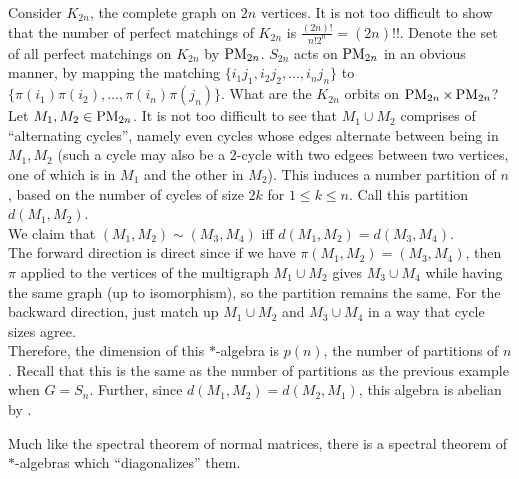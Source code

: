 	\begin{fex}
		Consider $K_{2n}$, the complete graph on $2n$ vertices. It is not too difficult to show that the number of perfect matchings of $K_{2n}$ is $\frac{(2n)!}{n!2^n} = (2n)!!$. Denote the set of all perfect matchings on $K_{2n}$ by $\operatorname{PM}_{2n}$. $S_{2n}$ acts on $\operatorname{PM}_{2n}$ in an obvious manner, by mapping the matching $\{i_1j_1,i_2j_2,\ldots,i_nj_n\}$ to $\{\pi(i_1)\pi(i_2),\ldots,\pi(i_n)\pi(j_n)\}$. What are the $K_{2n}$ orbits on $\operatorname{PM}_{2n} \times \operatorname{PM}_{2n}$?\\
		Let $M_1,M_2 \in \operatorname{PM}_{2n}$. It is not too difficult to see that $M_1 \cup M_2$ comprises of ``alternating cycles'', namely even cycles whose edges alternate between being in $M_1,M_2$ (such a cycle may also be a $2$-cycle with two edgees between two vertices, one of which is in $M_1$ and the other in $M_2$).  This induces a number partition of $n$, based on the number of cycles of size $2k$ for $1 \le k \le n$. Call this partition $d(M_1,M_2)$.\\
		
		We claim that $(M_1,M_2) \sim (M_3,M_4)$ iff $d(M_1,M_2) = d(M_3,M_4)$.\\
		The forward direction is direct since if we have $\pi (M_1,M_2) = (M_3,M_4)$, then $\pi$ applied to the vertices of the multigraph $M_1 \cup M_2$ gives $M_3 \cup M_4$ while having the same graph (up to isomorphism), so the partition remains the same. For the backward direction, just match up $M_1 \cup M_2$ and $M_3 \cup M_4$ in a way that cycle sizes agree.\\

		Therefore, the dimension of this $*$-algebra is $p(n)$, the number of partitions of $n$. Recall that this is the same as the number of partitions as the previous example when $G = S_n$. Further, since $d(M_1,M_2) = d(M_2,M_1)$, this algebra is abelian by .
	\end{fex}

	Much like the spectral theorem of normal matrices, there is a spectral theorem of $*$-algebras which ``diagonalizes'' them.

